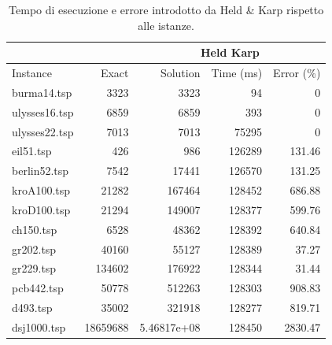 \begin{table}[h]
    \centering

    \begin{tabular}{lrrrr}
    \toprule
    \multicolumn{2}{c}{ } & \multicolumn{3}{c}{Held Karp} \\
    \hline
    Instance & Exact & Solution &   Time (ms) &   Error (\%) \\
    \hline
    burma14.tsp   &     3323 &   3323           &          94 &        0    \\
    ulysses16.tsp &     6859 &   6859           &         393 &        0    \\
    ulysses22.tsp &     7013 &   7013           &       75295 &        0    \\
    eil51.tsp     &      426 &    986           &      126289 &      131.46 \\
    berlin52.tsp  &     7542 &  17441           &      126570 &      131.25 \\
    kroA100.tsp   &    21282 & 167464           &      128452 &      686.88 \\
    kroD100.tsp   &    21294 & 149007           &      128377 &      599.76 \\
    ch150.tsp     &     6528 &  48362           &      128392 &      640.84 \\
    gr202.tsp     &    40160 &  55127           &      128389 &       37.27 \\
    gr229.tsp     &   134602 & 176922           &      128344 &       31.44 \\
    pcb442.tsp    &    50778 & 512263           &      128303 &      908.83 \\
    d493.tsp      &    35002 & 321918           &      128277 &      819.71 \\
    dsj1000.tsp   & 18659688 &      5.46817e+08 &      128450 &     2830.47 \\
    \bottomrule
    \end{tabular}

    \caption{Tempo di esecuzione e errore introdotto da Held \& Karp rispetto alle istanze.}
    \label{table:held-karp-runtime-accuracy}
\end{table}

